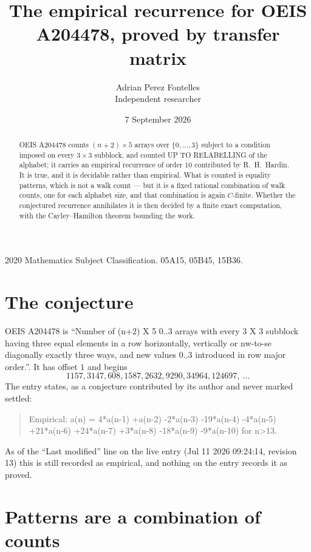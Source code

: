 \documentclass[11pt,a4paper]{article}
\title{The empirical recurrence for OEIS A204478, proved by transfer matrix}
\author{Adrian Perez Fontelles\\ \small Independent researcher}
\date{7 September 2026}
\theoremstyle{plain}
\theoremstyle{definition}
\begin{document}
\maketitle

\begin{abstract}
OEIS A204478 counts $(n+2)\times5$ arrays over $\{0,\dots,3\}$ subject to a condition imposed on
every $3\times3$ subblock, and counted UP TO RELABELLING of the
alphabet; it carries an empirical recurrence of order $10$ contributed by
R.~H.~Hardin. It is true, and it is decidable rather than empirical. What is counted is
equality patterns, which is not a walk count --- but it is a fixed rational combination of
walk counts, one for each alphabet size, and that combination is again $C$-finite. Whether the
conjectured recurrence annihilates it is then decided by a finite exact computation, with the
Cayley--Hamilton theorem bounding the work.
\end{abstract}

\noindent\small 2020 Mathematics Subject Classification. 05A15, 05B45, 15B36.\normalsize

\section{The conjecture}

OEIS A204478 is ``Number of (n+2) X 5 0..3 arrays with every 3 X 3 subblock having three equal elements in a row horizontally, vertically or nw-to-se diagonally exactly three ways, and new values 0..3 introduced in row major order.''. It has offset $1$ and begins
\[
1157, 3147, 608, 1587, 2632, 9290, 34964, 124697,\ \dots
\]
The entry states, as a conjecture contributed by its author and never marked settled:
\begin{quote}
Empirical: a(n) = 4*a(n-1) +a(n-2) -2*a(n-3) -19*a(n-4) -4*a(n-5) +21*a(n-6) +24*a(n-7) +3*a(n-8) -18*a(n-9) -9*a(n-10) for n>13.
\end{quote}
As of the ``Last modified'' line on the live entry (Jul 11 2026 09:24:14, revision 13) this is still
recorded as empirical, and nothing on the entry records it as proved.

\section{Patterns are a combination of counts}
\end{document}
